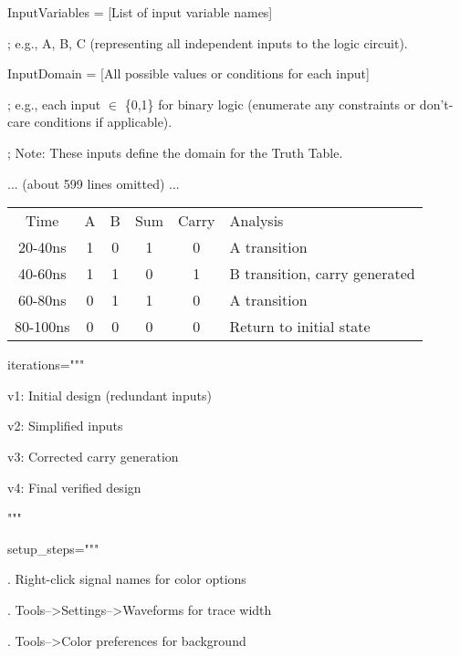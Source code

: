 \documentclass[11pt]{article}
\begin{document}

\noindent InputVariables = [List of input variable names]

\noindent ; e.g., A, B, C (representing all independent inputs to the logic circuit).

\vspace{0.5em}

\noindent InputDomain = [All possible values or conditions for each input]

\noindent ; e.g., each input $\in$ \{0,1\} for binary logic (enumerate any constraints or don't-care conditions if applicable).

\noindent ; Note: These inputs define the domain for the Truth Table.

\noindent ... (about 599 lines omitted) ...

\noindent \begin{tabular}{c|c|c|c|c|l}
Time  & A & B & Sum & Carry & Analysis \\
20-40ns & 1 & 0 &  1  &   0   & A transition \\
40-60ns & 1 & 1 &  0  &   1   & B transition, carry generated \\
60-80ns & 0 & 1 &  1  &   0   & A transition \\
80-100ns& 0 & 0 &  0  &   0   & Return to initial state
\end{tabular}

\vspace{0.5em}


\noindent iterations="""

\noindent v1: Initial design (redundant inputs)

\noindent v2: Simplified inputs

\noindent v3: Corrected carry generation

\noindent v4: Final verified design

\noindent """

\vspace{0.5em}


\noindent setup\_steps="""

. Right-click signal names for color options

. Tools-->Settings-->Waveforms for trace width

. Tools-->Color preferences for background
\end{document}

